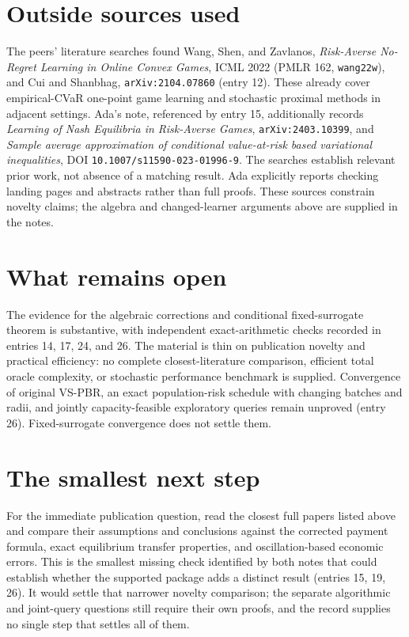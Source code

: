 \documentclass{article}
\begin{document}
\section*{Outside sources used}
The peers' literature searches found Wang, Shen, and Zavlanos,
\emph{Risk-Averse No-Regret Learning in Online Convex Games}, ICML 2022
(PMLR 162, \texttt{wang22w}), and Cui and Shanbhag,
\texttt{arXiv:2104.07860} (entry 12). These already cover empirical-CVaR
one-point game learning and stochastic proximal methods in adjacent settings.
Ada's note, referenced by entry 15, additionally records
\emph{Learning of Nash Equilibria in Risk-Averse Games},
\texttt{arXiv:2403.10399}, and \emph{Sample average approximation of
conditional value-at-risk based variational inequalities},
DOI \texttt{10.1007/s11590-023-01996-9}.
The searches establish relevant prior work, not absence of a matching result.
Ada explicitly reports checking landing pages and abstracts rather than full
proofs. These sources constrain novelty claims; the algebra and changed-learner
arguments above are supplied in the notes.

\section*{What remains open}
The evidence for the algebraic corrections and conditional fixed-surrogate
theorem is substantive, with independent exact-arithmetic checks recorded in
entries 14, 17, 24, and 26. The material is thin on publication novelty and
practical efficiency: no complete closest-literature comparison, efficient
total oracle complexity, or stochastic performance benchmark is supplied.
Convergence of original VS-PBR, an exact population-risk schedule with changing
batches and radii, and jointly capacity-feasible exploratory queries remain
unproved (entry 26). Fixed-surrogate convergence does not settle them.

\section*{The smallest next step}
For the immediate publication question, read the closest full papers listed
above and compare their assumptions and conclusions against the corrected
payment formula, exact equilibrium transfer properties, and oscillation-based
economic errors. This is the smallest missing check identified by both notes
that could establish whether the supported package adds a distinct result
(entries 15, 19, 26). It would settle that narrower novelty comparison;
the separate algorithmic and joint-query questions still require their own
proofs, and the record supplies no single step that settles all of them.
\end{document}
